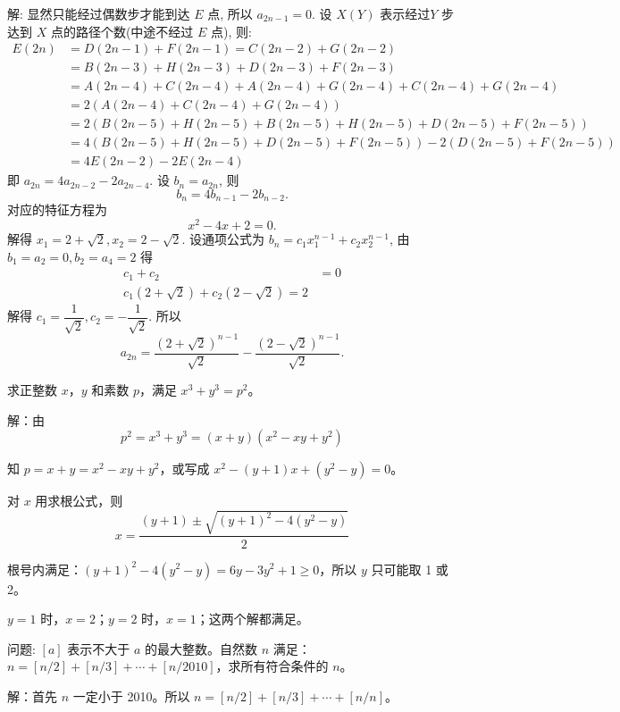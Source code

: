 解: 显然只能经过偶数步才能到达 $E$ 点, 所以 $a_{2n-1} = 0$. 设 $X(Y)$ 表示经过$Y$ 步达到 $X$ 点的路径个数(中途不经过 $E$ 点), 则:
\begin{align*}
E(2n) &= D(2n-1) + F(2n-1) = C(2n-2) + G(2n-2) \\
&= B(2n-3) + H(2n-3) + D(2n-3) + F(2n-3) \\
&= A(2n-4) + C(2n-4) + A(2n-4) + G(2n-4) + C(2n-4) + G(2n-4)\\
&= 2(A(2n-4) + C(2n-4) + G(2n-4)) \\
&= 2(B(2n-5)+H(2n-5) + B(2n-5) + H(2n-5) + D(2n-5) + F(2n-5) ) \\
&= 4(B(2n-5) + H(2n-5) + D(2n-5) + F(2n-5) ) - 2(D(2n-5) + F(2n-5))\\
&= 4E(2n-2) - 2E(2n-4)
\end{align*}
即 $a_{2n} = 4a_{2n-2}-2a_{2n-4}$.  设 $b_n = a_{2n}$, 则 
$$b_n = 4b_{n-1} - 2b_{n-2}. $$
对应的特征方程为
$$x^2 - 4x + 2 = 0 .$$
解得 $x_1 = 2+\sqrt{2}, x_2 = 2-\sqrt{2}$. 设通项公式为 $b_n = c_1x_1^{n-1} + c_2x_2^{n-1}$, 由
$b_1 = a_2 = 0, b_2 = a_4 = 2$ 得
\begin{align*}
c_1 + c_2 &= 0 \\
c_1(2+\sqrt{2}) + c_2(2-\sqrt{2}) = 2
\end{align*}
解得 $c_1 = \dfrac{1}{\sqrt{2}}, c_2 = -\dfrac{1}{\sqrt{2}}$. 所以
\[a_{2n} = \frac{(2+\sqrt{2})^{n-1}}{\sqrt{2}} - \frac{(2-\sqrt{2})^{n-1}}{\sqrt{2}} .\]

\newpage
求正整数 $ x $，$ y $ 和素数 $ p $，满足 $ x^3+y^3=p^2 $。

解：由 
\begin{equation*}
p^2=x^3+y^3=(x+y)(x^2-xy+y^2 )
\end{equation*}

知 $ p=x+y=x^2-xy+y^2 $，或写成 $ x^2-(y+1)x+(y^2-y)=0 $。

对 $ x $ 用求根公式，则
\[ 
x=\frac{(y+1)\pm\sqrt{(y+1)^2-4(y^2-y)}}{2} 
\]

根号内满足：$ (y+1)^2-4(y^2-y)=6y-3y^2+1\ge 0 $，所以 $ y $ 只可能取 1 或 2。

$ y=1 $ 时，$ x=2 $；$ y=2 $ 时，$ x=1 $；这两个解都满足。

\newpage
问题: $ [a] $ 表示不大于 $ a $ 的最大整数。自然数 $ n $ 满足：$ n=[n/2]+[n/3]+\cdots +[n/2010] $，求所有符合条件的 $ n $。

解：首先 $ n $ 一定小于 2010。所以 $ n=[n/2]+[n/3]+\cdots +[n/n] $。

